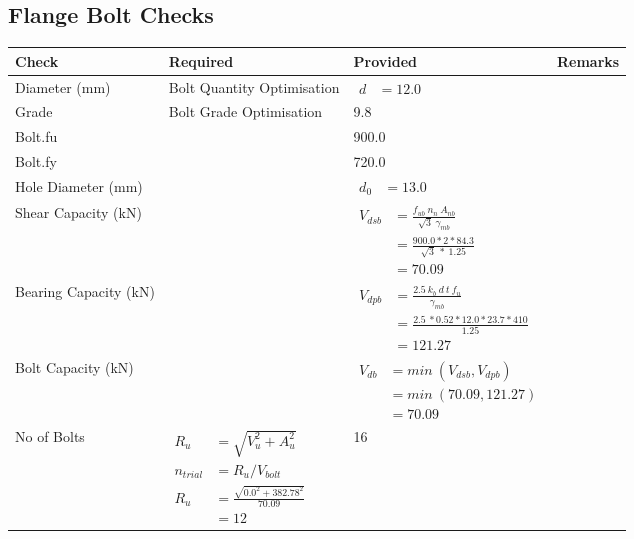\documentclass{article}%
\begin{document}
\subsection{Flange Bolt Checks}%
\label{subsec:FlangeBoltChecks}%
\renewcommand{\arraystretch}{1.2}%
\begin{longtable}{|p{4cm}|p{5cm}|p{5.5cm}|p{1.5cm}|}%
\hline%
\rowcolor{OsdagGreen}%
Check&Required&Provided&Remarks\\%
\hline%
\endhead%
\hline%
Diameter (mm)&Bolt Quantity Optimisation&$\begin{aligned} d &=12.0\end{aligned}$&\\%
\hline%
Grade&Bolt Grade Optimisation&9.8&\\%
\hline%
Bolt.fu&&900.0&\\%
\hline%
Bolt.fy&&720.0&\\%
\hline%
Hole Diameter (mm)& &$\begin{aligned} d_0 &=13.0\end{aligned}$&\\%
\hline%
Shear Capacity (kN)&&$\begin{aligned}V_{dsb} &= \frac{f_{ub} ~n_n~ A_{nb}}{\sqrt{3} ~\gamma_{mb}}\\ &= \frac{900.0*2*84.3}{\sqrt{3}~*~1.25}\\ &= 70.09\end{aligned}$&\\%
\hline%
Bearing Capacity (kN)&&$\begin{aligned}V_{dpb} &= \frac{2.5~ k_b~ d~ t~ f_u}{\gamma_{mb}}\\ &= \frac{2.5~*0.52*12.0*23.7*410}{1.25}\\ &=121.27\end{aligned}$&\\%
\hline%
Bolt Capacity (kN)&&$\begin{aligned}V_{db} &= min~ (V_{dsb}, V_{dpb})\\ &= min~ (70.09,121.27)\\ &=70.09\end{aligned}$&\\%
\hline%
No of Bolts&$\begin{aligned}R_{u} &= \sqrt{V_u^2+A_u^2}\\ n_{trial} &= R_u/ V_{bolt}\\ R_{u} &= \frac{\sqrt{0.0^2+382.78^2}}{70.09}\\ &=12\end{aligned}$&16&\\%
\hline%

\end{longtable}
\end{document}
